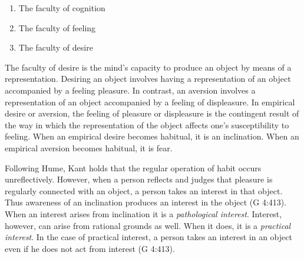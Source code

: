 \begin{enumerate}
	\item The faculty of cognition
	\item The faculty of feeling
	\item The faculty of desire
\end{enumerate}

The faculty of desire is the mind’s capacity to produce an object by means of a representation. Desiring an object involves having a representation of an object accompanied by a feeling pleasure. In contrast, an aversion involves a representation of an object accompanied by a feeling of displeasure. In empirical desire or aversion, the feeling of pleasure or displeasure is the contingent result of the way in which the representation of the object affects one’s susceptibility to feeling. When an empirical desire becomes habitual, it is an inclination. When an empirical aversion becomes habitual, it is fear.

Following Hume, Kant holds that the regular operation of habit occurs unreflectively. However, when a person reflects and judges that pleasure is regularly connected with an object, a person takes an interest in that object. Thus awareness of an inclination produces an interest in the object (G 4:413). When an interest arises from inclination it is a \emph{pathological interest}. Interest, however, can arise from rational grounds as well. When it does, it is a \emph{practical interest}. In the case of practical interest, a person takes an interest in an object even if he does not act from interest (G 4:413). \change

% 

